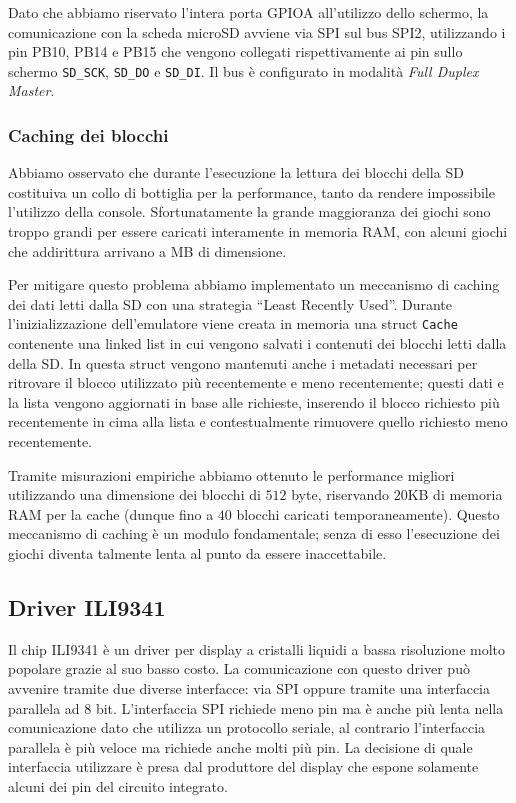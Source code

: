 \documentclass[hidelinks,12pt]{article}
\begin{document}
Dato che abbiamo riservato l'intera porta GPIOA all'utilizzo dello schermo,
la comunicazione con la scheda microSD avviene via SPI sul bus SPI2,
utilizzando i pin PB10, PB14 e PB15 che vengono collegati rispettivamente
ai pin sullo schermo \texttt{SD\_SCK}, \texttt{SD\_DO} e \texttt{SD\_DI}.
Il bus è configurato in modalità \textit{Full Duplex Master}.

\subsubsection{Caching dei blocchi}
Abbiamo osservato che durante l'esecuzione la lettura dei blocchi della SD
costituiva un collo di bottiglia per la performance, tanto da rendere
impossibile l'utilizzo della console. Sfortunatamente la grande maggioranza
dei giochi sono troppo grandi per essere caricati interamente in memoria RAM,
con alcuni giochi che addirittura arrivano a MB di dimensione.

Per mitigare questo problema abbiamo implementato un meccanismo di caching dei
dati letti dalla SD con una strategia ``Least Recently Used''.
Durante l'inizializzazione dell'emulatore viene creata in memoria una struct
\texttt{Cache} contenente una linked list in cui vengono salvati i contenuti
dei blocchi letti dalla della SD.
In questa struct vengono mantenuti anche i metadati necessari per
ritrovare il blocco utilizzato più recentemente e meno recentemente; questi dati
e la lista vengono aggiornati in base alle richieste, inserendo il blocco
richiesto più recentemente in cima alla lista e contestualmente rimuovere quello
richiesto meno recentemente.

Tramite misurazioni empiriche abbiamo ottenuto le performance migliori
utilizzando una dimensione dei blocchi di $512$ byte, riservando $20$KB di
memoria RAM per la cache (dunque fino a $40$ blocchi caricati temporaneamente).
Questo meccanismo di caching è un modulo fondamentale; senza di esso l'esecuzione
dei giochi diventa talmente lenta al punto da essere inaccettabile.

\subsection{Driver ILI9341}
Il chip ILI9341 è un driver per display a cristalli liquidi a bassa risoluzione
molto popolare grazie al suo basso costo. La comunicazione con questo driver
può avvenire tramite due diverse interfacce: via SPI oppure tramite una
interfaccia parallela ad 8 bit.
L'interfaccia SPI richiede meno pin ma è anche più lenta nella comunicazione
dato che utilizza un protocollo seriale, al contrario l'interfaccia parallela
è più veloce ma richiede anche molti più pin.
La decisione di quale interfaccia utilizzare è presa dal produttore del
display che espone solamente alcuni dei pin del circuito integrato.
\end{document}
